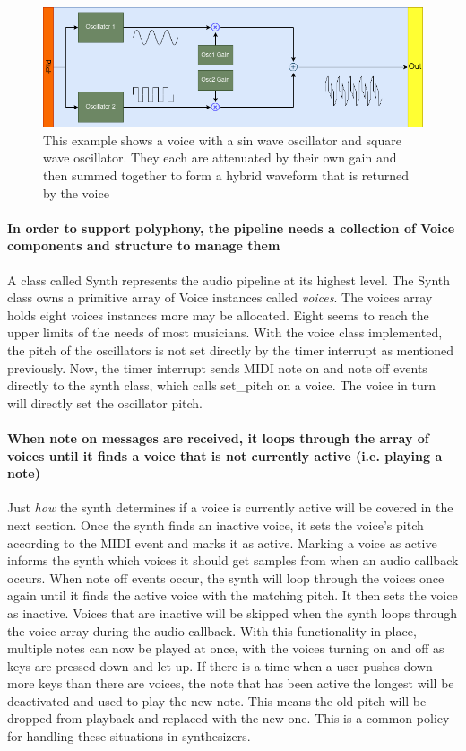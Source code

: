 \documentclass[acmlarge,screen]{acmart}
\begin{document}
	\begin{figure}[H]
		\includegraphics[width=\linewidth]{simple_voice}
		\caption{This example shows a voice with a sin wave oscillator and square wave oscillator. They each are attenuated by their own gain and then summed together to form a hybrid waveform that is returned by the voice}
		\centering
	\end{figure}
	
	\paragraph{In order to support polyphony, the pipeline needs a collection of Voice components and structure to manage them} A class called Synth represents the audio pipeline at its highest level. The Synth class owns a primitive array of Voice instances called \textit{voices}. The voices array holds eight voices instances more may be allocated. Eight seems to reach the upper limits of the needs of most musicians. With the voice class implemented, the pitch of the oscillators is not set directly by the timer interrupt as mentioned previously. Now, the timer interrupt sends MIDI note on and note off events directly to the synth class, which calls set\_pitch on a voice. The voice in turn will directly set the oscillator pitch.
	
	\paragraph{When note on messages are received, it loops through the array of voices until it finds a voice that is not currently active (i.e. playing a note)} Just \textit{how} the synth determines if a voice is currently active will be covered in the next section. Once the synth finds an inactive voice, it sets the voice's pitch according to the MIDI event and marks it as active. Marking a voice as active informs the synth which voices it should get samples from when an audio callback occurs. When note off events occur, the synth will loop through the voices once again until it finds the active voice with the matching pitch. It then sets the voice as inactive. Voices that are inactive will be skipped when the synth loops through the voice array during the audio callback. With this functionality in place, multiple notes can now be played at once, with the voices turning on and off as keys are pressed down and let up. If there is a time when a user pushes down more keys than there are voices, the note that has been active the longest will be deactivated and used to play the new note. This means the old pitch will be dropped from playback and replaced with the new one. This is a common policy for handling these situations in synthesizers.
	
\end{document}
